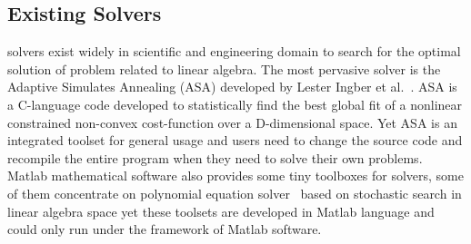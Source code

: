 \subsection{Existing \SA Solvers}
\SA solvers exist widely in scientific and engineering domain to search for the optimal solution of problem related to linear algebra. The most pervasive \SA solver is the Adaptive Simulates Annealing (ASA) developed by Lester Ingber et al.~\cite{Lester:2013}. ASA is a C-language code developed to statistically find the best global fit of a nonlinear constrained non-convex cost-function over a D-dimensional space. Yet ASA is an integrated toolset for general usage and users need to change the source code and recompile the entire program when they need to solve their own problems. Matlab mathematical software also provides some tiny toolboxes for \SA solvers, some of them concentrate on polynomial equation solver~\cite{Matlab:2009} based on stochastic search in linear algebra space yet these toolsets are developed in Matlab language and could only run under the framework of Matlab software. 